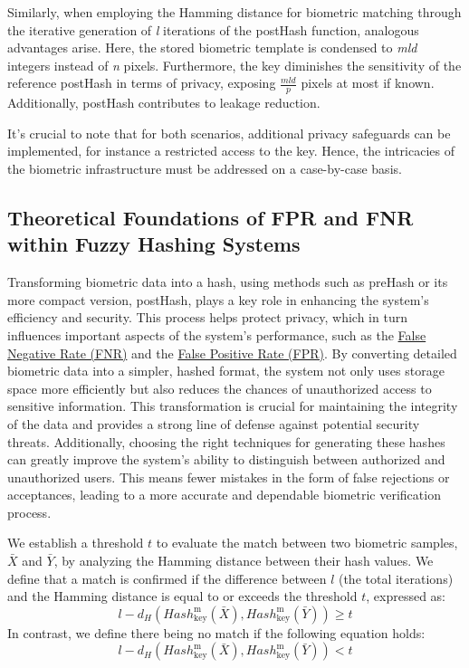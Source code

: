 Similarly, when employing the Hamming distance for biometric matching through the iterative generation of \textit{l} iterations of the postHash function, analogous advantages arise. Here, the stored biometric template is condensed to \textit{mld} integers instead of \textit{n} pixels. Furthermore, the key diminishes the sensitivity of the reference postHash in terms of privacy, exposing \(\frac{mld}{p}\) pixels at most if known. Additionally, postHash contributes to leakage reduction.

It's crucial to note that for both scenarios, additional privacy safeguards can be implemented, for instance a restricted access to the key. Hence, the intricacies of the biometric infrastructure must be addressed on a case-by-case basis.

\subsection{Theoretical Foundations of FPR and FNR within Fuzzy Hashing Systems}

Transforming biometric data into a hash, using methods such as preHash or its more compact version, postHash, plays a key role in enhancing the system's efficiency and security. This process helps protect privacy, which in turn influences important aspects of the system's performance, such as the \hyperref[def:FNR]{False Negative Rate (FNR)} and the \hyperref[def:FPR]{False Positive Rate (FPR)}. By converting detailed biometric data into a simpler, hashed format, the system not only uses storage space more efficiently but also reduces the chances of unauthorized access to sensitive information. This transformation is crucial for maintaining the integrity of the data and provides a strong line of defense against potential security threats. Additionally, choosing the right techniques for generating these hashes can greatly improve the system's ability to distinguish between authorized and unauthorized users. This means fewer mistakes in the form of false rejections or acceptances, leading to a more accurate and dependable biometric verification process.

We establish a threshold \(t\) to evaluate the match between two biometric samples, \(\bar{X}\) and \(\bar{Y}\), by analyzing the Hamming distance between their hash values.
We define that a match is confirmed if the difference between \(l\) (the total iterations) and the Hamming distance is equal to or exceeds the threshold \(t\), expressed as: \[l - d_H(Hash_{\text{key}}^\text{m}(\bar{X}), Hash_{\text{key}}^\text{m}(\bar{Y})) \geq t\]
In contrast, we define there being no match if the following equation holds: \[l - d_H(Hash_{\text{key}}^\text{m}(\bar{X}), Hash_{\text{key}}^\text{m}(\bar{Y})) < t\]

